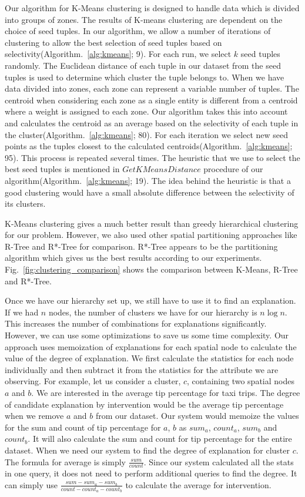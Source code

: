 Our algorithm for K-Means clustering is designed to handle data which is divided into groups of zones. The results of K-means clustering are dependent on the choice of seed tuples. In our algorithm, we allow a number of iterations of clustering to allow the best selection of seed tuples based on selectivity(Algorithm.~\ref{alg:kmeans}; 9). For each run, we select $k$ seed tuples randomly. The Euclidean distance of each tuple in our dataset from the seed tuples is used to determine which cluster the tuple belongs to. When we have data divided into zones, each zone can represent a variable number of tuples. The centroid when considering each zone as a single entity is different from a centroid where a weight is assigned to each zone. Our algorithm takes this into account and calculates the centroid as an average based on the selectivity of each tuple in the cluster(Algorithm.~\ref{alg:kmeans}; 80). For each iteration we select new seed points as the tuples closest to the calculated centroids(Algorithm.~\ref{alg:kmeans}; 95). This process is repeated several times. The heuristic that we use to select the best seed tuples is mentioned in $GetKMeansDistance$ procedure of our algorithm(Algorithm.~\ref{alg:kmeans}; 19). The idea behind the heuristic is that a good clustering would have a small absolute difference between the selectivity of its clusters.

K-Means clustering gives a much better result than greedy hierarchical clustering for our problem. However, we also used other spatial partitioning approaches like R-Tree and R*-Tree for comparison. R*-Tree appears to be the partitioning algorithm which gives us the best results according to our experiments. Fig.~\ref{fig:clustering_comparison} shows the comparison between K-Means, R-Tree and R*-Tree.

Once we have our hierarchy set up, we still have to use it to find an explanation. If we had $n$ nodes, the number of clusters we have for our hierarchy is $n \log n$.  This increases the number of combinations for explanations significantly. However, we can use some optimizations to save us some time complexity. Our approach uses memoization of explanations for each spatial node to calculate the value of the degree of explanation. We first calculate the statistics for each node individually and then subtract it from the statistics for the attribute we are observing. For example, let us consider a cluster, $c$, containing two spatial nodes $a$ and $b$. We are interested in the average tip percentage for taxi trips. The degree of candidate explanation by intervention would be the average tip percentage when we remove $a$ and $b$ from our dataset. Our system would memoize the values for the sum and count of tip percentage for $a$, $b$ as $sum_a$, $count_a$, $sum_b$ and $count_b$. It will also calculate the sum and count for tip percentage for the entire dataset. When we need our system to find the degree of explanation for cluster $c$. The formula for average is simply $\frac{sum}{count}$. Since our system calculated all the stats in one query, it does not need to perform additional queries to find the degree. It can simply use $\frac{sum-sum_a-sum_b}{count-count_a-count_b}$ to calculate the average for intervention.


